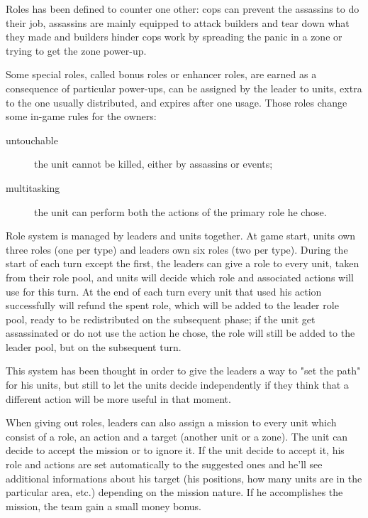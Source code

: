 			Roles has been defined to counter one other: cops can prevent the assassins to do their job, assassins are mainly equipped to attack builders and tear down what they made and builders hinder cops work by spreading the panic in a zone or trying to get the zone power-up.
			
			Some special roles, called bonus roles or enhancer roles, are earned as a consequence of particular power-ups, can be assigned by the leader to units, extra to the one usually distributed, and expires after one usage.
			Those roles change some in-game rules for the owners:
			\begin{description}
				\item[untouchable] the unit cannot be killed, either by assassins or events;
				\item[multitasking] the unit can perform both the actions of the primary role he chose.
			\end{description} 
			
			Role system is managed by leaders and units together.
			At game start, units own three roles (one per type) and leaders own six roles (two per type).
			During the start of each turn except the first, the leaders can give a role to every unit, taken from their role pool, and units will decide which role and associated actions will use for this turn.
			At the end of each turn every unit that used his action successfully will refund the spent role, which will be added to the leader role pool, ready to be redistributed on the subsequent phase; if the unit get assassinated or do not use the action he chose, the role will still be added to the leader pool, but on the subsequent turn.
			
			This system has been thought in order to give the leaders a way to "set the path" for his units, but still to let the units decide independently if they think that a different action will be more useful in that moment.
		
			
			When giving out roles, leaders can also assign a mission to every unit which consist of a role, an action and a target (another unit or a zone).
			The unit can decide to accept the mission or to ignore it. If the unit decide to accept it, his role and actions are set automatically to the suggested ones and he'll see additional informations about his target (his positions, how many units are in the particular area, etc.) depending on the mission nature. If he accomplishes the mission, the team gain a small money bonus.
			
